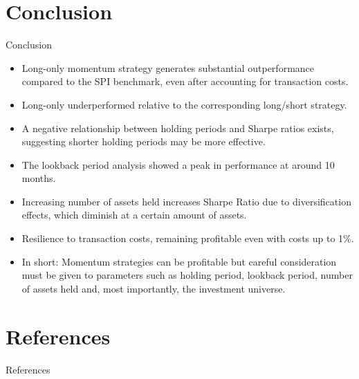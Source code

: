\documentclass[10pt]{beamer}
\begin{document}
\section{Conclusion}
\begin{frame}{Conclusion}

\begin{itemize}
    \item Long-only momentum strategy generates substantial outperformance compared to the SPI benchmark, even after accounting for transaction costs.
    \item Long-only underperformed relative to the corresponding long/short strategy.
    \item A negative relationship between holding periods and Sharpe ratios exists, suggesting shorter holding periods may be more effective.
    \item The lookback period analysis showed a peak in performance at around 10 months. 
    \item Increasing number of assets held increases Sharpe Ratio due to diversification effects, which diminish at a certain amount of assets.
    \item Resilience to transaction costs, remaining profitable even with costs up to 1\%.  
    \item In short: Momentum strategies can be profitable but careful consideration must be given to parameters such as holding period, lookback period, number of assets held and, most importantly, the investment universe. 
\end{itemize}
\end{frame}

\section{References}
\begin{frame}{References}

\printbibliography

\end{frame}
\end{document}
